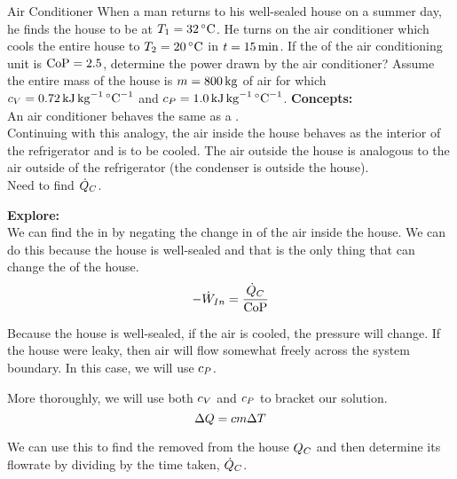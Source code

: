 \begin{example}{Air Conditioner}
  When a man returns to his well-sealed house on a summer day, he finds the house to be at $\Temp_{1} = \SI{32}{\degreeCelsius}$.
  He turns on the air conditioner which cools the entire house to $\Temp_{2} = \SI{20}{\degreeCelsius}$ in $t = \SI{15}{\minute}$.
  If the  of the air conditioning unit is $\text{CoP} = 2.5$, determine the power drawn by the air conditioner?
  Assume the entire mass of the house is $m = \SI{800}{\kilo\gram}$ of air for which $\SpecificHeatVolume = \SI{0.72}{\kilo\joule\per\kilo\gram\per\degreeCelsius}$ and $\SpecificHeatPressure = \SI{1.0}{\kilo\joule\per\kilo\gram\per\degreeCelsius}$.
  \tcblower{}
  \textbf{Concepts:} \\
  An air conditioner behaves the same as a . \\
  Continuing with this analogy, the air inside the house behaves as the interior of the refrigerator and is to be cooled.
  The air outside the house is analogous to the air outside of the refrigerator (the condenser is outside the house). \\
  Need to find $\dot{Q}_{C}$.

  \textbf{Explore:} \\
  We can find the  in by negating the change in  of the air inside the house.
  We can do this because the house is well-sealed and that is the only thing that can change the  of the house. \\
  \begin{equation*}
    -\dot{W}_{In} = \frac{\dot{Q}_{C}}{\text{CoP}}
  \end{equation*}

  Because the house is well-sealed, if the air is cooled, the pressure will change.
  If the house were leaky, then air will flow somewhat freely across the system boundary.
  In this case, we will use $c_{P}$.

  More thoroughly, we will use both $c_{V}$ and $c_{P}$ to bracket our solution.
  \begin{equation*}
    \Delta Q = c m \Delta T
  \end{equation*}

  We can use this to find the  removed from the house $Q_{C}$ and then determine its flowrate by dividing by the time taken, $\dot{Q}_{C}$.


\end{example}
